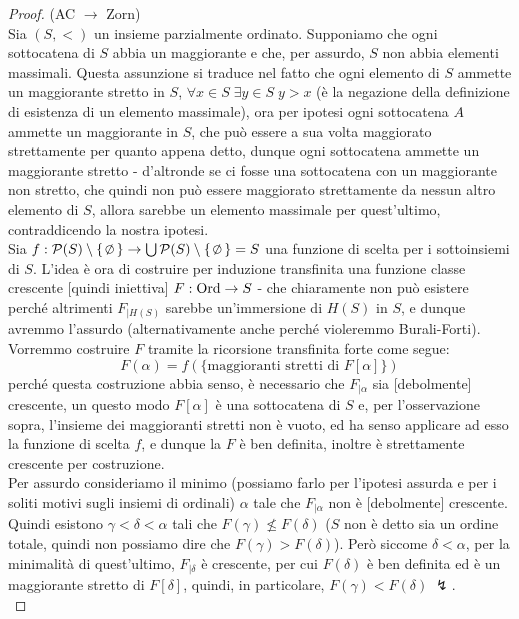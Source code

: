 \begin{proof}
	(AC $\rightarrow$ Zorn)\\
	Sia $(S,<)$ un insieme parzialmente ordinato. Supponiamo che ogni sottocatena di $S$ abbia un maggiorante e che, per assurdo, $S$ non abbia elementi massimali.
	Questa assunzione si traduce nel fatto che ogni elemento di $S$ ammette un maggiorante stretto in $S$, $\forall x \in S \; \exists y \in S \; y > x$ (\`e la negazione della definizione di esistenza di un elemento massimale), ora per ipotesi ogni sottocatena $A$ ammette un maggiorante in $S$, che pu\`o essere a sua volta maggiorato strettamente per quanto appena detto,
	dunque ogni sottocatena ammette un maggiorante stretto - d'altronde se ci fosse una sottocatena con un maggiorante non stretto, che quindi non pu\`o essere maggiorato strettamente da nessun altro elemento di $S$, allora sarebbe un elemento massimale per quest'ultimo, contraddicendo la nostra ipotesi.\\
	Sia $f : \ps(S) \setminus \{\emptyset\} \to \bigcup \ps(S) \setminus \{\emptyset\} = S$ una funzione di scelta per i sottoinsiemi di $S$. L'idea \`e ora di costruire per induzione transfinita una funzione classe crescente [quindi iniettiva] $F : \operatorname{Ord} \to S$ - che chiaramente non pu\`o esistere 
	perch\'e altrimenti $F_{|H(S)}$ sarebbe un'immersione di $H(S)$ in $S$, e dunque avremmo l'assurdo (alternativamente anche perch\'e violeremmo Burali-Forti). Vorremmo costruire $F$ tramite la ricorsione transfinita forte come segue:
	\[ F(\alpha) = f(\{\text{maggioranti stretti di $F[\alpha]$}\})
		\]
	perch\'e questa costruzione abbia senso, \`e necessario che $F_{|\alpha}$ sia [debolmente] crescente, un questo modo $F[\alpha]$ \`e una sottocatena di $S$ e, per l'osservazione sopra, l'insieme dei maggioranti stretti non \`e vuoto, ed ha senso applicare ad esso la funzione di scelta $f$, e dunque la $F$ \`e ben definita,
	inoltre \`e strettamente crescente per costruzione.\\
	Per assurdo consideriamo il minimo (possiamo farlo per l'ipotesi assurda e per i soliti motivi sugli insiemi di ordinali) $\alpha$ tale che $F_{|\alpha}$ non \`e [debolmente] crescente. Quindi esistono $\gamma < \delta < \alpha$ tali che $F(\gamma) \not \leq F(\delta)$ ($S$ non \`e detto sia un ordine totale,
	quindi non possiamo dire che $F(\gamma) > F(\delta)$). Per\`o siccome $\delta < \alpha$, per la minimalit\`a di quest'ultimo, $F_{|\delta}$ \`e crescente, per cui $F(\delta)$ \`e ben definita
	ed \`e un maggiorante stretto di $F[\delta]$, quindi, in particolare, $F(\gamma) < F(\delta) \; \lightning$.\\

\end{proof}
